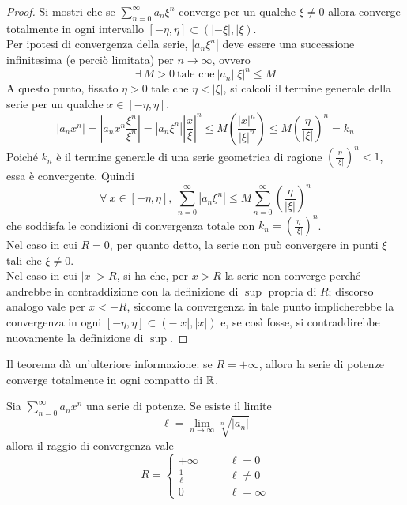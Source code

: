 \begin{proof}
 Si mostri che se $\sum\limits_{n=0}^{\infty}{a_n \xi^n}$ converge per un qualche $\xi \neq 0$ allora converge totalmente in ogni intervallo $[-\eta, \eta] \subset (|-\xi|, |\xi)$.\\
 Per ipotesi di convergenza della serie, $|a_n \xi^n|$ deve essere una successione infinitesima (e perciò limitata) per $n\to \infty$, ovvero
 \begin{equation}
     \exists\ M>0\ \text{tale che}\ |a_n||\xi|^n\leq M
 \end{equation}
 A questo punto, fissato $\eta>0$ tale che $\eta<|\xi|$, si calcoli il termine generale della serie per un qualche $x \in [-\eta, \eta]$.
 \begin{equation}
     |a_n x^n| = \left|a_n x^n \frac{\xi^n}{\xi^n}\right|=\left|a_n \xi^n\right| \left|\frac{x}{\xi}\right|^n \leq M \left(\frac{|x|^n}{\left|\xi\right|^n} \right)\leq M \left(\frac{\eta}{\left| \xi \right|} \right)^n =k_n
 \end{equation}
 Poiché $k_n$ è il termine generale di una serie geometrica di ragione $\left(\tfrac{\eta}{\left| \xi \right|} \right)^n < 1$, essa è convergente. Quindi
 \begin{equation}
 \forall\ x \in [-\eta, \eta],\ \sum\limits_{n=0}^{\infty}{|a_n \xi^n|} \leq M \sum_{n=0}^{\infty}{\left(\frac{\eta}{\left| \xi \right|} \right)^n}
 \end{equation}
 che soddisfa le condizioni di convergenza totale con $k_n=\left(\tfrac{\eta}{\left| \xi \right|} \right)^n$.\\
 Nel caso in cui $R=0$, per quanto detto, la serie non può convergere in punti $\xi$ tali che $\xi \neq 0$.\\
 Nel caso in cui $|x|>R$, si ha che, per $x>R$ la serie non converge perché andrebbe in contraddizione con la definizione di $\sup$ propria di $R$; discorso analogo vale per $x<-R$, siccome la convergenza in tale punto implicherebbe la convergenza in ogni $[-\eta, \eta] \subset (-|x|, |x|)$ e, se così fosse, si contraddirebbe nuovamente la definizione di $\sup$.
\end{proof}
\begin{oss}
Il teorema dà un'ulteriore informazione: se $R= +\infty$, allora la serie di potenze converge totalmente in ogni compatto di $\mathbb{R}$.
\end{oss}
\begin{theorem} \label{Teo: Criterio di Cauchy-Hadamard}
Sia $\sum\limits_{n=0}^{\infty}{a_n x^n}$ una serie di potenze. Se esiste il limite
\begin{equation}
    \ell=\lim_{n \to \infty}{\sqrt[n]{|a_n|}}
\end{equation}
    allora il raggio di convergenza vale
    \begin{equation}
        R = \begin{cases}
            +\infty &\qquad \ell=0\\
            \frac{1}{\ell} &\qquad \ell \neq 0\\
            0 &\qquad \ell = \infty
        \end{cases}
    \end{equation}
\end{theorem}
